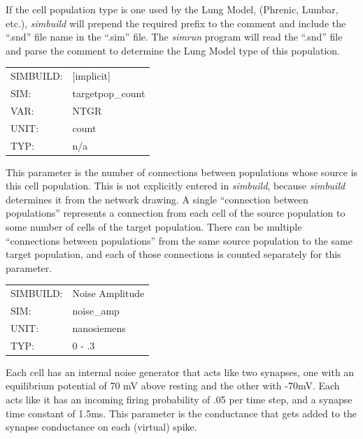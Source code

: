 \documentclass[12pt,openany,oneside]{book}
\newcommand{\prog}[1]{\textit{{#1}}}
\newcommand{\ext}[1]{{{``.#1''}}}
\newcommand{\inquotes}[1]{{{``#1''}}}
\begin{document}
If the cell population type is one used by the Lung Model, (Phrenic, Lumbar,
etc.), \prog{simbuild} will prepend the required prefix to the comment and
include the \ext{snd} file name in the \ext{sim} file. The \prog{simrun}
program will read the \ext{snd} file and parse the comment to determine
the Lung Model type of this population.
\filbreak
\vspace{\baselineskip}

\begin{flushleft}
\begin{tabular}{@{}ll@{}}
SIMBUILD: & [implicit]\\
SIM: & targetpop\_count\\
VAR: & NTGR\\
UNIT: & count\\
TYP: & n/a\\
\end{tabular}
\end{flushleft}
\noindent
This parameter is the number of connections between populations whose
source is this cell population. This is not explicitly entered in
\prog{simbuild}, because \prog{simbuild} determines it from the network drawing. A
single \inquotes{connection between populations} represents a connection from
each cell of the source population to some number of cells of the
target population. There can be multiple \inquotes{connections between
populations} from the same source population to the same target
population, and each of those connections is counted separately for
this parameter.
\filbreak
\vspace{\baselineskip}

\begin{flushleft}
\begin{tabular}{@{}ll@{}}
SIMBUILD: & Noise Amplitude\\
SIM: & noise\_amp\\
UNIT: & nanosiemens\\
TYP: & 0 - .3\\
\end{tabular}
\end{flushleft}
\noindent
Each cell has an internal noise generator that acts like two synapses,
one with an equilibrium potential of 70 mV above resting and the other
with -70mV. Each acts like it has an incoming firing probability of
.05 per time step, and a synapse time constant of 1.5ms. This
parameter is the conductance that gets added to the synapse
conductance on each (virtual) spike.
\filbreak
\vspace{\baselineskip}
\end{document}
